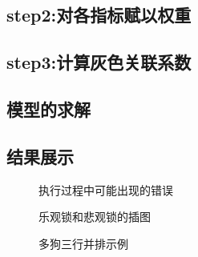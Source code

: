 \documentclass[withoutpreface,bwprint]{cumcmthesis} %
\begin{document}
\subsection*{step2:对各指标赋以权重}
 
\subsection*{step3:计算灰色关联系数}
 
\subsection{模型的求解}
 
\subsection{结果展示}
\begin{figure}[H]
	\centering
	\begin{minipage}[c]{0.48\textwidth}
		\centering
	\end{minipage}
	\begin{minipage}[c]{0.48\textwidth}
		\centering
	\end{minipage}
	\caption{执行过程中可能出现的错误}
\end{figure}
 
\begin{figure}[H]
	\centering
	\begin{minipage}[c]{0.48\textwidth}
		\centering
	\end{minipage}
	\begin{minipage}[c]{0.48\textwidth}
		\centering
	\end{minipage}
	\caption{乐观锁和悲观锁的插图}
\end{figure}
 
\begin{figure}[H]
	\centering
	\begin{minipage}[c]{0.3\textwidth}
		\centering
		\label{fig:sample-figure-a}
	\end{minipage}
	\begin{minipage}[c]{0.3\textwidth}
		\centering
		\label{fig:sample-figure-b}
	\end{minipage}
	\begin{minipage}[c]{0.3\textwidth}
		\centering
		\label{fig:sample-figure-c}
	\end{minipage}
	\caption{多狗三行并排示例}
	\label{fig:sample-figure}
\end{figure}
 
\end{document}
